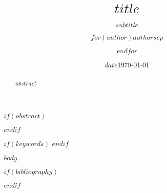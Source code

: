 \documentclass[a4paper,UTF8]{ctexart}
\title{$title$}
\subtitle{$subtitle$}
\author{$for(author)$$author$$sep$ \and $endfor$}
\date{$date$}
\date{\today}
\begin{document}
\maketitle

$if(abstract)$
\begin{abstract}
$abstract$
\end{abstract}
$endif$

$if(keywords)$
$endif$

$body$

$if(bibliography)$


$endif$
\end{document}
